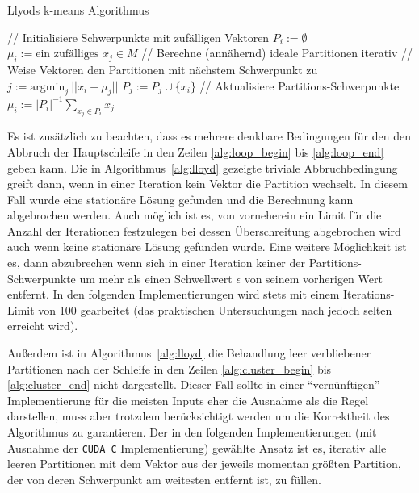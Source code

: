 \documentclass[
    bibliography=totoc, cd=lightcolor, cdmath=false, ngerman]{tudscrreprt}
\begin{document}
\begin{algorithm}
    \caption{Llyods k-means Algorithmus}
    \begin{algorithmic}[1]
            \State // Initialisiere Schwerpunkte mit zufälligen Vektoren
                \State $P_i := \emptyset$
                \State $\mu_i := \text{ein zufälliges } x_j \in M$
            \EndFor
            \State // Berechne (annähernd) ideale Partitionen iterativ
             \label{alg:loop_begin}
                \State // Weise Vektoren den Partitionen mit nächstem Schwerpunkt zu
                 \label{alg:cluster_begin}
                    \State $j := \mathrm{argmin}_j\ ||x_i - \mu_j||$
                    \State $P_j := P_j \cup \{x_i\}$
                \EndFor \label{alg:cluster_end}
                \State // Aktualisiere Partitions-Schwerpunkte
                    \State $\mu_i := |P_i|^{-1} \sum_{x_j \in P_i} x_j$
                \EndFor
            \EndWhile \label{alg:loop_end}
        \EndProcedure
    \end{algorithmic}
    \label{alg:lloyd}
\end{algorithm}

Es ist zusätzlich zu beachten, dass es mehrere denkbare Bedingungen für den den
Abbruch der Hauptschleife in den Zeilen \ref{alg:loop_begin} bis
\ref{alg:loop_end} geben kann. Die in Algorithmus~\ref{alg:lloyd} gezeigte
triviale Abbruchbedingung greift dann, wenn in einer Iteration kein Vektor die
Partition wechselt. In diesem Fall wurde eine stationäre Lösung gefunden und
die Berechnung kann abgebrochen werden. Auch möglich ist es, von vorneherein
ein Limit für die Anzahl der Iterationen festzulegen bei dessen Überschreitung
abgebrochen wird auch wenn keine stationäre Lösung gefunden wurde. Eine weitere
Möglichkeit ist es, dann abzubrechen wenn sich in einer Iteration keiner der
Partitions-Schwerpunkte um mehr als einen Schwellwert $\epsilon$ von seinem
vorherigen Wert entfernt. In den folgenden Implementierungen wird stets mit
einem Iterations-Limit von 100 gearbeitet (das praktischen Untersuchungen nach
jedoch selten erreicht wird).

Außerdem ist in Algorithmus~\ref{alg:lloyd} die Behandlung leer verbliebener
Partitionen nach der Schleife in den Zeilen \ref{alg:cluster_begin} bis
\ref{alg:cluster_end} nicht dargestellt. Dieser Fall sollte in einer
``vernünftigen'' Implementierung für die meisten Inputs eher die Ausnahme als
die Regel darstellen, muss aber trotzdem berücksichtigt werden um die
Korrektheit des Algorithmus zu garantieren. Der in den folgenden
Implementierungen (mit Ausnahme der \texttt{CUDA C} Implementierung) gewählte
Ansatz ist es, iterativ alle leeren Partitionen mit dem Vektor aus der jeweils
momentan größten Partition, der von deren Schwerpunkt am weitesten entfernt
ist, zu füllen.
\end{document}
